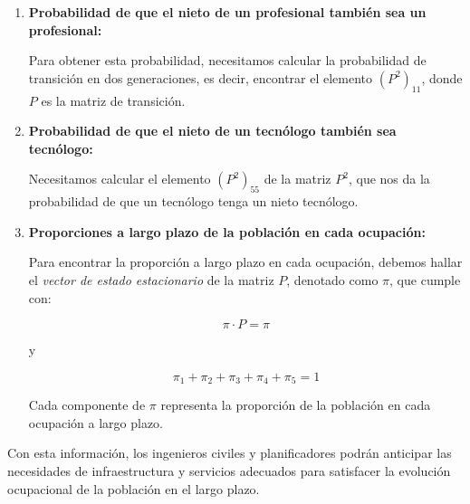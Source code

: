 \documentclass{article}  %
\begin{document}
\begin{enumerate}
    \item \textbf{Probabilidad de que el nieto de un profesional también sea un profesional:}
    
    Para obtener esta probabilidad, necesitamos calcular la probabilidad de transición en dos generaciones, es decir, encontrar el elemento \((P^2)_{11}\), donde \( P \) es la matriz de transición.

    \item \textbf{Probabilidad de que el nieto de un tecnólogo también sea tecnólogo:}
    
    Necesitamos calcular el elemento \((P^2)_{55}\) de la matriz \(P^2\), que nos da la probabilidad de que un tecnólogo tenga un nieto tecnólogo.

    \item \textbf{Proporciones a largo plazo de la población en cada ocupación:}
    
    Para encontrar la proporción a largo plazo en cada ocupación, debemos hallar el \textit{vector de estado estacionario} de la matriz \( P \), denotado como \( \pi \), que cumple con:
    
    \[
    \pi \cdot P = \pi
    \]
    
    y
    
    \[
    \pi_1 + \pi_2 + \pi_3 + \pi_4 + \pi_5 = 1
    \]

    Cada componente de \( \pi \) representa la proporción de la población en cada ocupación a largo plazo. 
\end{enumerate}

Con esta información, los ingenieros civiles y planificadores podrán anticipar las necesidades de infraestructura y servicios adecuados para satisfacer la evolución ocupacional de la población en el largo plazo.
\end{document}
